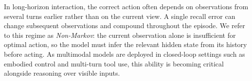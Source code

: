 \documentclass{llmxive}
\begin{document}
In long-horizon interaction, the correct action often depends on observations from several turns earlier rather than on the current view. 
A single recall error can change subsequent observations and compound throughout the episode.
We refer to this regime as \emph{Non-Markov}: 
the current observation alone is insufficient for optimal action, 
so the model must infer the relevant hidden state from its history before acting.
As multimodal models are deployed in closed-loop settings such as embodied control and multi-turn tool use, 
this ability is becoming critical alongside reasoning over visible inputs.


\end{document}
